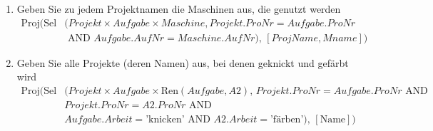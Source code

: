 \begin{enumerate}
    \item Geben Sie zu jedem Projektnamen die Maschinen aus, die genutzt werden
        \begin{align*}
            \text{Proj}\bigl(
            \text{Sel}&(Projekt \times Aufgabe \times Maschine, Projekt.ProNr = Aufgabe.ProNr \\ 
            &\text{ AND } Aufgabe.AufNr = Maschine.AufNr),\, [ProjName, Mname]
            \bigr)
        \end{align*}

    \item Geben Sie alle Projekte (deren Namen) aus, bei denen geknickt und gefärbt wird
        \begin{align*}
            \text{Proj}\bigl(
            \text{Sel}&(Projekt \times Aufgabe \times \text{Ren}(Aufgabe, A2),\, 
            Projekt.ProNr = Aufgabe.ProNr \text{ AND } \\
            &Projekt.ProNr = A2.ProNr \text{ AND } \\
            &Aufgabe.Arbeit = \text{'knicken'} \text{ AND } A2.Arbeit = \text{'färben'}),\, 
            [\text{Name}]
            \bigr)
        \end{align*}
\end{enumerate}
